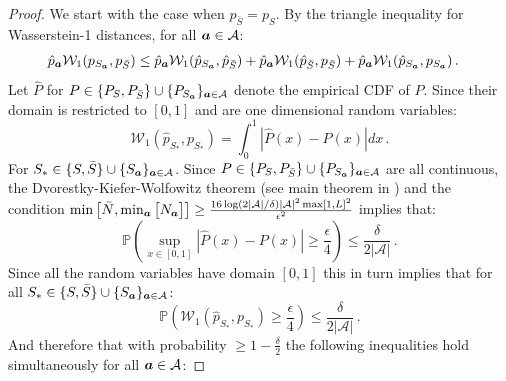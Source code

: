 \documentclass[letterpaper]{article}
\theoremstyle{definition}
\newcommand{\W}{\mathcal{W}}
\newcommand{\bS}{\bar{S}}
\begin{document}
\begin{proof}
We start with the case when $p_{\bS} = p_{S}$.
By the triangle inequality for Wasserstein-1 distances, for all ${\bm{a}} \in\mathcal{A}$:
\begin{align}\label{equation::triangle_inequality}
\hskip-0.3cm  \hat{p}_{\va} \W_1( p_{S_\va} , p_{\bS} ) \leq \hat{p}_{\va} \W_1( \hat{p}_{S_\va}, \hat{p}_{\bS}   ) + \hat{p}_{\va} \W_1( \hat{p}_{\bS}, p_{\bS} ) +\hat{p}_{\va} \W_1(\hat{p}_{S_\va}, p_{S_\va} )\,.
\end{align}
Let $\hat{P}$ for $P \in \{  P_S, P_{\bS}\} \cup \{  P_{S_\va}\}_{\va \in \mathcal{A}}$ denote the empirical CDF of $P$. Since their domain is restricted to $[0,1]$ and are one dimensional random variables:
\begin{equation}
    \W_1(\hat{p}_{S_*}, p_{S_*}) = \int_{0}^1 |\hat{P}(x) - P(x) | dx\,.
\end{equation}
For $S_* \in \{  S, {\bS}\} \cup \{  {S_\va}\}_{\va \in \mathcal{A}}$. Since $P \in \{  P_S, P_{\bS}\} \cup \{  P_{S_\va}\}_{\va \in \mathcal{A}}$ are all continuous, the Dvorestky-Kiefer-Wolfowitz theorem (see main theorem in \cite{massart90tight} ) and the condition $\min\big[\bar{N}, \min_{{\bm{a}}}\big[N_{\bm{a}}\big]\big]\geq  \frac{16\log(2|\mathcal{A}|/\delta)|\mathcal{A}|^2\max[1, L]^2}{\epsilon^2}$ implies that:
\begin{equation*}
    \mathbb{P}\left( \sup_{x\in [0,1]} | \hat{P}(x) - P(x) | \geq \frac{\epsilon}{4} \right) \leq  \frac{\delta}{2 | \mathcal{A}| }\,.
\end{equation*}
Since all the random variables have domain $[0,1]$ this in turn implies that for all $S_* \in \{  S, {\bS}\} \cup \{  {S_\va}\}_{\va \in \mathcal{A}}$:
\begin{equation*}
    \mathbb{P}\left( \W_1(\hat{p}_{S_*}, p_{S_*}) \geq \frac{\epsilon}{4} \right) \leq  \frac{\delta}{2 | \mathcal{A}| }\,.
\end{equation*}
And therefore that with probability $\geq 1-\frac{\delta}{2}$ the following inequalities hold simultaneously for all ${\bm{a}} \in \mathcal{A}$:

\end{proof}
\end{document}
